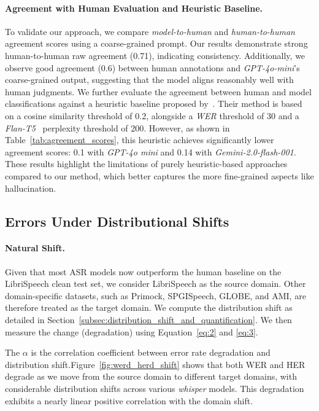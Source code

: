 \paragraph{Agreement with Human Evaluation and Heuristic Baseline.} To validate our approach, we compare \emph{model-to-human} and \emph{human-to-human} agreement scores using a coarse-grained prompt. Our results demonstrate strong human-to-human raw agreement (0.71), indicating consistency. Additionally, we observe good agreement (0.6) between human annotations and \emph{GPT-4o-mini}'s coarse-grained output, suggesting that the model aligns reasonably well with human judgments.
We further evaluate the agreement between human and model classifications against a heuristic baseline proposed by~\cite{frieske2024hallucinations}. Their method is based on a cosine similarity threshold of 0.2, alongside a \emph{WER} threshold of 30 and a \emph{Flan-T5}~\cite{chung2024scaling} perplexity threshold of 200. However, as shown in Table~\ref{tab:agreement_scores}, this heuristic achieves significantly lower agreement scores: 0.1 with \emph{GPT-4o mini} and 0.14 with \emph{Gemini-2.0-flash-001}. These results highlight the limitations of purely heuristic-based approaches compared to our method, which better captures the more fine-grained aspects like hallucination.



\subsection{Errors Under Distributional Shifts}

\paragraph{Natural Shift.} Given that most ASR models now outperform the human baseline on the LibriSpeech clean test set, we consider LibriSpeech as the source domain. Other domain-specific datasets, such as Primock, SPGISpeech, GLOBE, and AMI, are therefore treated as the target domain. We compute the distribution shift as detailed in Section~\ref{subsec:distribution_shift_and_quantification}. We then measure the change (degradation) using Equation~\ref{eq:2} and \ref{eq:3}.
 

The $\alpha$ is the correlation coefficient between error rate degradation and distribution shift.Figure~\ref{fig:werd_herd_shift} shows that both WER and HER degrade as we move from the source domain to different target domains, with considerable distribution shifts across various \emph{whisper} models. This degradation exhibits a nearly linear positive correlation with the domain shift.


